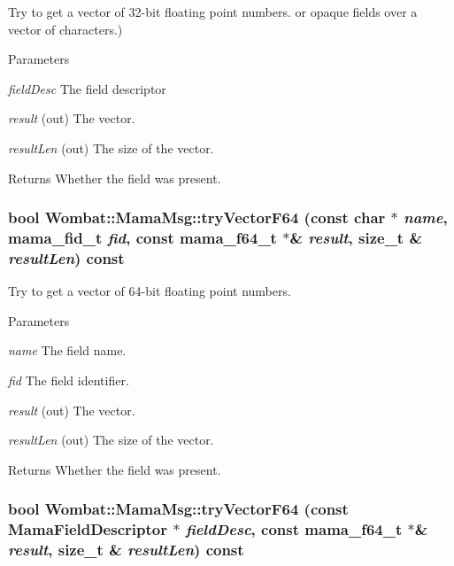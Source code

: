 Try to get a vector of 32-\/bit floating point numbers. or opaque fields over a vector of characters.) 
\begin{DoxyParams}{Parameters}
\item[{\em fieldDesc}]The field descriptor \item[{\em result}](out) The vector. \item[{\em resultLen}](out) The size of the vector. \end{DoxyParams}
\begin{DoxyReturn}{Returns}
Whether the field was present. 
\end{DoxyReturn}
\hypertarget{classWombat_1_1MamaMsg_a9203766d9f47ded07e047091ba4073b7}{
\subsubsection[{tryVectorF64}]{\setlength{\rightskip}{0pt plus 5cm}bool Wombat::MamaMsg::tryVectorF64 (const char $\ast$ {\em name}, \/  mama\_\-fid\_\-t {\em fid}, \/  const mama\_\-f64\_\-t $\ast$\& {\em result}, \/  size\_\-t \& {\em resultLen}) const}}
\label{classWombat_1_1MamaMsg_a9203766d9f47ded07e047091ba4073b7}


Try to get a vector of 64-\/bit floating point numbers. 
\begin{DoxyParams}{Parameters}
\item[{\em name}]The field name. \item[{\em fid}]The field identifier. \item[{\em result}](out) The vector. \item[{\em resultLen}](out) The size of the vector. \end{DoxyParams}
\begin{DoxyReturn}{Returns}
Whether the field was present. 
\end{DoxyReturn}
\hypertarget{classWombat_1_1MamaMsg_afff62156a02e1c92a822af9b4b55d576}{
\subsubsection[{tryVectorF64}]{\setlength{\rightskip}{0pt plus 5cm}bool Wombat::MamaMsg::tryVectorF64 (const {\bf MamaFieldDescriptor} $\ast$ {\em fieldDesc}, \/  const mama\_\-f64\_\-t $\ast$\& {\em result}, \/  size\_\-t \& {\em resultLen}) const}}
\label{classWombat_1_1MamaMsg_afff62156a02e1c92a822af9b4b55d576}


